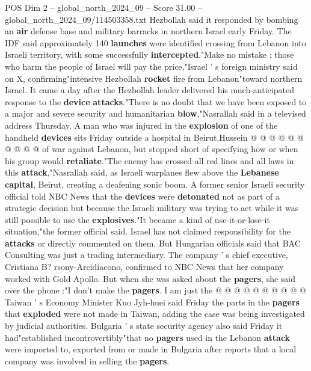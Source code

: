 \begin{textsample}{POS Dim 2 – global\_north\_2024\_09 – Score 31.00 – global\_north\_2024\_09/114503358.txt}
Hezbollah said it responded by bombing an \textbf{air} defense base and military barracks in northern Israel early Friday.
The IDF said approximately 140 \textbf{launches} were identified crossing from Lebanon into Israeli territory, with some successfully \textbf{intercepted}."Make no mistake : those who harm the people of Israel will pay the price,"Israel ' s foreign ministry said on X, confirming"intensive Hezbollah \textbf{rocket} fire from Lebanon"toward northern Israel.
It came a day after the Hezbollah leader delivered his much-anticipated response to the \textbf{device} \textbf{attacks}."There is no doubt that we have been exposed to a major and severe security and humanitarian \textbf{blow},"Nasrallah said in a televised address Thursday.
A man who was injured in the \textbf{explosion} of one of the handheld \textbf{devices} sits Friday outside a hospital in Beirut.Hussein @ @ @ @ @ @ @ @ @ @ of war against Lebanon, but stopped short of specifying how or when his group would \textbf{retaliate}."The enemy has crossed all red lines and all laws in this \textbf{attack},"Nasrallah said, as Israeli warplanes flew above the \textbf{Lebanese} \textbf{capital}, Beirut, creating a deafening sonic boom.
A former senior Israeli security official told NBC News that the \textbf{devices} were \textbf{detonated} not as part of a strategic decision but because the Israeli military was trying to act while it was still possible to use the \textbf{explosives}."It became a kind of use-it-or-lose-it situation,"the former official said.
Israel has not claimed responsibility for the \textbf{attacks} or directly commented on them.
But Hungarian officials said that BAC Consulting was just a trading intermediary.
The company ' s chief executive, Cristiana B? rsony-Arcidiacono, confirmed to NBC News that her company worked with Gold Apollo.
But when she was asked about the \textbf{pagers}, she said over the phone :"I don't make the \textbf{pagers}.
I am just the @ @ @ @ @ @ @ @ @ @ Taiwan ' s Economy Minister Kuo Jyh-huei said Friday the parts in the \textbf{pagers} that \textbf{exploded} were not made in Taiwan, adding the case was being investigated by judicial authorities.
Bulgaria ' s state security agency also said Friday it had"established incontrovertibly"that no \textbf{pagers} used in the Lebanon \textbf{attack} were imported to, exported from or made in Bulgaria after reports that a local company was involved in selling the \textbf{pagers}.

\end{textsample}
